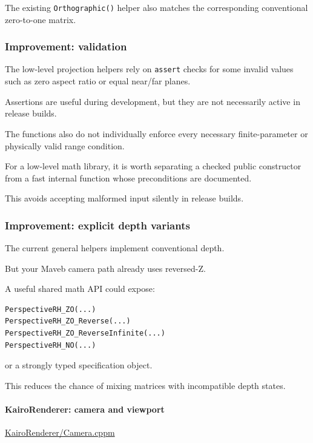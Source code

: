 The existing \texttt{Orthographic()} helper also matches the corresponding conventional zero-to-one matrix.

\subsubsection{Improvement: validation}\label{improvement-validation}

The low-level projection helpers rely on \texttt{assert} checks for some invalid values such as zero aspect ratio or equal near/far planes.

Assertions are useful during development, but they are not necessarily active in release builds.

The functions also do not individually enforce every necessary finite-parameter or physically valid range condition.

For a low-level math library, it is worth separating a checked public constructor from a fast internal function whose preconditions are documented.

This avoids accepting malformed input silently in release builds.

\subsubsection{Improvement: explicit depth variants}\label{improvement-explicit-depth-variants}

The current general helpers implement conventional depth.

But your Maveb camera path already uses reversed-Z.

A useful shared math API could expose:

\begin{verbatim}
PerspectiveRH_ZO(...)
PerspectiveRH_ZO_Reverse(...)
PerspectiveRH_ZO_ReverseInfinite(...)
PerspectiveRH_NO(...)
\end{verbatim}

or a strongly typed specification object.

This reduces the chance of mixing matrices with incompatible depth states.

\paragraph{KairoRenderer: camera and viewport}\label{kairorenderer-camera-and-viewport}

\href{https://github.com/swayam8624/KairoRenderer/blob/main/Camera.cppm?utm_source=chatgpt.com}{KairoRenderer/Camera.cppm}

